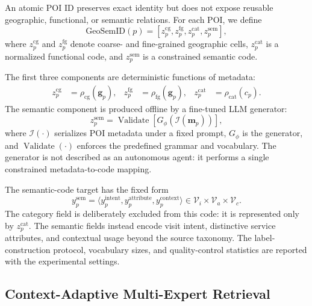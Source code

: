 \documentclass[journal]{IEEEtran}
\newcommand{\gsid}{\mathrm{GeoSemID}}
\begin{document}
An atomic POI ID preserves exact identity but does not expose reusable
geographic, functional, or semantic relations.
For each POI, we define
\begin{equation}
\gsid(p)
=
[
z_{p}^{\mathrm{cg}},
z_{p}^{\mathrm{fg}},
z_{p}^{\mathrm{cat}},
z_{p}^{\mathrm{sem}}
],
\label{eq:geosemid_definition}
\end{equation}
where $z_{p}^{\mathrm{cg}}$ and $z_{p}^{\mathrm{fg}}$ denote coarse- and
fine-grained geographic cells, $z_{p}^{\mathrm{cat}}$ is a normalized
functional code, and $z_{p}^{\mathrm{sem}}$ is a constrained semantic code.

The first three components are deterministic functions of metadata:
\begin{align}
z_{p}^{\mathrm{cg}}&=\rho_{\mathrm{cg}}(\bm{g}_p),&
z_{p}^{\mathrm{fg}}&=\rho_{\mathrm{fg}}(\bm{g}_p),&
z_{p}^{\mathrm{cat}}&=\rho_{\mathrm{cat}}(c_p).
\label{eq:deterministic_codes}
\end{align}
The semantic component is produced offline by a fine-tuned LLM generator:
\begin{equation}
z_{p}^{\mathrm{sem}}
=
\operatorname{Validate}
\left[
G_{\phi}\!\left(\mathcal{I}(\bm{m}_p)\right)
\right],
\label{eq:semantic_generation}
\end{equation}
where $\mathcal{I}(\cdot)$ serializes POI metadata under a fixed prompt,
$G_{\phi}$ is the generator, and $\operatorname{Validate}(\cdot)$ enforces
the predefined grammar and vocabulary.
The generator is not described as an autonomous agent: it performs a single
constrained metadata-to-code mapping.

The semantic-code target has the fixed form
\begin{equation}
y_p^{\mathrm{sem}}
=
\langle
y_p^{\mathrm{intent}},
y_p^{\mathrm{attribute}},
y_p^{\mathrm{context}}
\rangle
\in
\mathcal{V}_{i}\times\mathcal{V}_{a}\times\mathcal{V}_{c}.
\label{eq:semantic_schema}
\end{equation}
The category field is deliberately excluded from this code: it is represented
only by $z_p^{\mathrm{cat}}$. The semantic fields instead encode visit intent,
distinctive service attributes, and contextual usage beyond the source
taxonomy. The label-construction protocol, vocabulary sizes, and quality-control
statistics are reported with the experimental settings.

\subsection{Context-Adaptive Multi-Expert Retrieval}
\end{document}
